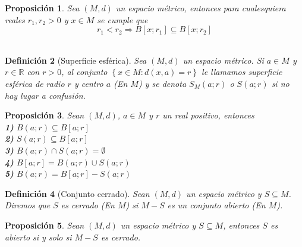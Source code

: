 \documentclass[oneside]{book} %
\theoremstyle{Teorema}
\newtheorem{Definicion}{Definición}[chapter]
\newtheorem{Proposicion}[Definicion]{Proposición}
\theoremstyle{Ejemplos}
\theoremstyle{[Obs]}
\renewcommand{\{}{\left\lbrace} %
\renewcommand{\}}{\right\rbrace} %
\renewcommand{\u}{\cup} %
\newcommand{\n}{\cap} %
\renewcommand{\sc}{\subseteq} %
\newcommand{\R}{\mathbb{R}} %
\begin{document}
			\begin{Proposicion}
				
				Sea $(M, d)$ un espacio métrico, entonces para cualesquiera reales $r_1, r_2 > 0$ y $x \in M$ se cumple que \\
				
				\[ r_1 < r_2 \Rightarrow B[x;r_1] \sc B[x;r_2] \] \\

			\end{Proposicion}

			\begin{Definicion}[Superficie esférica]
				
				Sea $(M, d)$ un espacio métrico. Si $a \in M$ y $r \in \R$ con $r > 0$, al conjunto $\{ x \in M : d(x, a) = r \}$ le llamamos superficie esférica de radio $r$ y centro $a$ (En $M$) y se denota $S_M(a;r)$ o $S(a;r)$ si no hay lugar a confusión. \\

			\end{Definicion}

			\begin{Proposicion}
				
				Sean $(M, d)$, $a \in M$ y $r$ un real positivo, entonces \\

				\textbf{1)} $B(a;r) \sc B[a;r]$ \\

				\textbf{2)} $S(a;r) \sc B[a;r]$ \\

				\textbf{3)} $B(a;r) \n S(a;r) = \emptyset$ \\

				\textbf{4)} $B[a;r] = B(a;r) \u S(a;r)$ \\

				\textbf{5)} $B(a;r) = B[a;r] - S(a;r)$ \\

			\end{Proposicion}

			\begin{Definicion}[Conjunto cerrado]

				Sean $(M, d)$ un espacio métrico y $S \sc M$. Diremos que $S$ es cerrado (En $M$) si $M - S$ es un conjunto abierto (En $M$). \\

			\end{Definicion}

			\begin{Proposicion}
				
				Sean $(M, d)$ un espacio métrico y $S \sc M$, entonces $S$ es abierto si y solo si $M - S$ es cerrado. \\

			\end{Proposicion}
\end{document}
